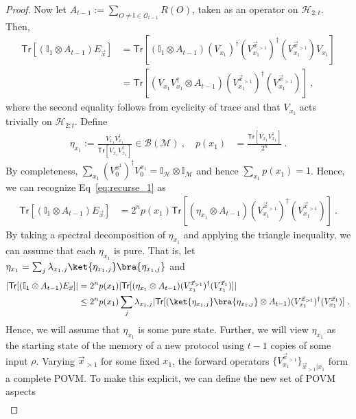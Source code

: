 \documentclass[11pt]{article}
\newcommand{\id}{\ensuremath{\mathbb{I}}}
\newcommand{\Tr}{\mathsf{Tr}}
\newcommand{\Oc}{\mathcal{O}}
\newcommand{\Hc}{\mathcal{H}}
\newcommand{\Mc}{\mathcal{M}}
\begin{document}
\begin{proof}
    Now let $A_{t-1} := \sum_{O \neq \id \in \Oc_{t-1}} R(O)$, taken as an operator on $\Hc_{2:t}$. Then,
    \begin{align}
        \Tr[(\id_1 \otimes A_{t-1}) E_{\vec{x}}] & = \Tr[(\id_1 \otimes A_{t-1}) (V_{x_1})^\dagger (V_{x_1}^{\vec{x}_{>1}})^\dagger (V_{x_1}^{\vec{x}_{>1}}) V_{x_1}] \\
        & = \Tr[(V_{x_1}V_{x_1}^\dagger \otimes A_{t-1}) (V_{x_1}^{\vec{x}_{>1}})^\dagger (V_{x_1}^{\vec{x}_{>1}})]\ , \label{eq:recurse_1}
    \end{align}
    where the second equality follows from cyclicity of trace and that $V_{x_1}$ acts trivially on $\Hc_{2:t}$. Define
    \begin{align}
        \eta_{x_1} := \frac{V_{x_1}V_{x_1}^\dagger}{\Tr[V_{x_1} V_{x_1}^\dagger]} \in \mathcal{B}(\Mc)\ , \quad p(x_1) & = \frac{\Tr[V_{x_1}V_{x_1}^\dagger]}{2^n} \ .
    \end{align}
    By completeness, $\sum_{x_1} (V_0^{x^1})^\dagger V_0^{x_1} = \id_{\Hc}\otimes \id_{\Mc}$ and hence $\sum_{x_1}p(x_1) = 1$. Hence, we can recognize Eq~\eqref{eq:recurse_1} as  
    \begin{align}
        \Tr[(\id_1 \otimes A_{t-1}) E_{\vec{x}}] & = 2^n p(x_1) \Tr[(\eta_{x_1}\otimes A_{t-1}) (V_{x_1}^{\vec{x}_{>1}})^\dagger (V_{x_1}^{\vec{x}_{>1}})]\ .
    \end{align}
    By taking a spectral decomposition of $\eta_{x_1}$ and applying the triangle inequality, we can assume that each $\eta_{x_1}$ is pure. That is, let $\eta_{x_1} = \sum_j \lambda_{x_1,j} \ket{\eta_{x_1,j}}\bra{\eta_{x_1,j}}$ and
    \begin{align}
        \vert \Tr[(\id_1 \otimes A_{t-1}) E_{\vec{x}}]\vert  & = 2^n p(x_1) \vert \Tr[ (\eta_{x_1} \otimes A_{t-1}) (V_{x_1}^{\vec{x}_{>1}})^\dagger (V_{x_1}^{\vec{x}_1})] \vert\\
        & \leq 2^n p(x_1) \sum_j \lambda_{x_1,j} \vert \Tr[ ( \ket{\eta_{x_1,j}}\bra{\eta_{x_1,j}} \otimes A_{t-1}) (V_{x_1}^{\vec{x}_{>1}})^\dagger (V_{x_1}^{\vec{x}_1})] \ .
    \end{align}
    Hence, we will assume that $\eta_{x_1}$ is some pure state. Further, we will view $\eta_{x_1}$ as the starting state of the memory of a new protocol using $t-1$ copies of some input $\rho$. Varying $\vec{x}_{>1}$ for some fixed $x_1$, the forward operators $\{ V_{x_1}^{\vec{x}_{>1}}\}_{\vec{x}_{>1} \vert x_1}$ form a complete POVM. To make this explicit, we can define the new set of POVM aspects
    \begin{align}

\end{align}
\end{proof}
\end{document}
